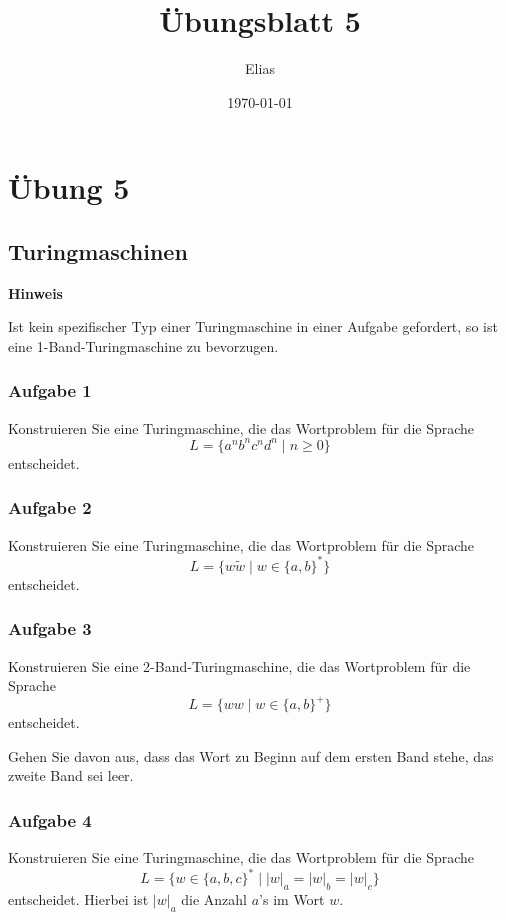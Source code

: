 \documentclass[a4paper,14pt,ngerman]{scrartcl}
\author{Elias}
\date{\today}
\title{Übungsblatt 5}
\begin{document}
\section{\textbf{Übung 5}}
\label{sec:orgf272dcf}
\subsection{\textbf{Turingmaschinen}}
\label{sec:orge25e881}

\textbf{Hinweis}

Ist kein spezifischer Typ einer Turingmaschine in einer Aufgabe
gefordert, so ist eine 1-Band-Turingmaschine zu bevorzugen.
\subsubsection{\textbf{Aufgabe 1}}
\label{sec:org03445b1}

Konstruieren Sie eine Turingmaschine, die das Wortproblem für die
Sprache \[L=\{a^nb^nc^nd^n \mid n\geq 0 \}\] entscheidet.
\subsubsection{\textbf{Aufgabe 2}}
\label{sec:orgf8057f0}

Konstruieren Sie eine Turingmaschine, die das Wortproblem für die
Sprache \[L=\{w\tilde{w} \mid w \in \{a,b\}^*\}\] entscheidet.
\subsubsection{\textbf{Aufgabe 3}}
\label{sec:org9a2ba17}

Konstruieren Sie eine 2-Band-Turingmaschine, die das Wortproblem für die
Sprache \[L=\{ww \mid w \in \{a,b\}^+\}\] entscheidet.

Gehen Sie davon aus, dass das Wort zu Beginn auf dem ersten Band stehe,
das zweite Band sei leer.
\subsubsection{\textbf{Aufgabe 4}}
\label{sec:org6479df5}

Konstruieren Sie eine Turingmaschine, die das Wortproblem für die
Sprache \[L=\{w \in \{a,b,c\}^*\mid |w|_a=|w|_b=|w|_c\}\] entscheidet.
Hierbei ist \(|w|_a\) die Anzahl \(a\)'s im Wort \(w\).
\end{document}
